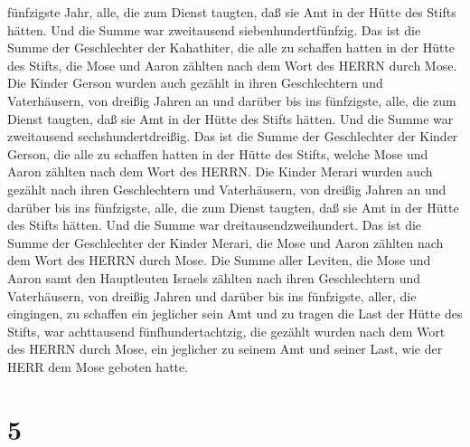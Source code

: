 fünfzigste Jahr, alle, die zum Dienst taugten, daß sie Amt in der Hütte
des Stifts hätten.  Und die Summe war zweitausend
siebenhundertfünfzig.  Das ist die Summe der Geschlechter
der Kahathiter, die alle zu schaffen hatten in der Hütte des Stifts, die
Mose und Aaron zählten nach dem Wort des HERRN durch Mose. 
Die Kinder Gerson wurden auch gezählt in ihren Geschlechtern und
Vaterhäusern,  von dreißig Jahren an und darüber bis ins
fünfzigste, alle, die zum Dienst taugten, daß sie Amt in der Hütte des
Stifts hätten.  Und die Summe war zweitausend
sechshundertdreißig.  Das ist die Summe der Geschlechter
der Kinder Gerson, die alle zu schaffen hatten in der Hütte des Stifts,
welche Mose und Aaron zählten nach dem Wort des HERRN.  Die
Kinder Merari wurden auch gezählt nach ihren Geschlechtern und
Vaterhäusern,  von dreißig Jahren an und darüber bis ins
fünfzigste, alle, die zum Dienst taugten, daß sie Amt in der Hütte des
Stifts hätten.  Und die Summe war dreitausendzweihundert.
 Das ist die Summe der Geschlechter der Kinder Merari, die
Mose und Aaron zählten nach dem Wort des HERRN durch Mose. 
Die Summe aller Leviten, die Mose und Aaron samt den Hauptleuten Israels
zählten nach ihren Geschlechtern und Vaterhäusern,  von
dreißig Jahren und darüber bis ins fünfzigste, aller, die eingingen, zu
schaffen ein jeglicher sein Amt und zu tragen die Last der Hütte des
Stifts,  war achttausend fünfhundertachtzig, 
die gezählt wurden nach dem Wort des HERRN durch Mose, ein jeglicher zu
seinem Amt und seiner Last, wie der HERR dem Mose geboten hatte.

\hypertarget{section-4}{%
\section{5}\label{section-4}}

